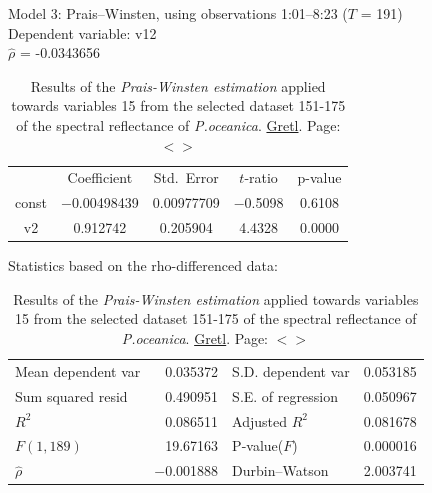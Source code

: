 \documentclass[11pt]{article}
\begin{document}
\begin{appendices}
\begin{table}[H]
	\begin{center}
	\caption{Results of the \textit{Prais-Winsten estimation} applied towards variables 15 from the selected dataset 151-175 of the spectral reflectance of \textit{P.oceanica}. \href{http://gretl.sourceforge.net/}{Gretl}. Page: $<$\pageref{page-41}$>$}
	\label{tab:26}
		Model 3: Prais--Winsten, using observations 1:01--8:23 ($T$ = 191)\\
		Dependent variable: v12\\
	$\hat{\rho}$ = -0.0343656

	\vspace{1em}

	\begin{tabular}{|c c c c c|}
		  & {Coefficient} &  {Std.\ Error} & {$t$-ratio} &   {p-value} \\[1ex]
		const &   $-$0.00498439 &     0.00977709 &       $-$0.5098 &         0.6108 \\
		v2 &   0.912742 &     0.205904 &      4.4328 &         0.0000 \\
	\end{tabular}

	\vspace{1em}Statistics based on the rho-differenced data:

	\vspace{1ex}
	\begin{tabular}{lrlr}
		Mean dependent var &  0.035372 & S.D. dependent var &  0.053185 \\
		Sum squared resid &  0.490951 & S.E. of regression &  0.050967 \\
		$R^2$ &  0.086511 & Adjusted $R^2$ &  0.081678 \\
		$F(1, 189)$ &  19.67163 & P-value($F$) &  0.000016 \\
		$\hat{\rho}$ & $-$0.001888 & Durbin--Watson &  2.003741 \\
	\end{tabular}
	\end{center}
\end{table}


\end{appendices}
\end{document}
